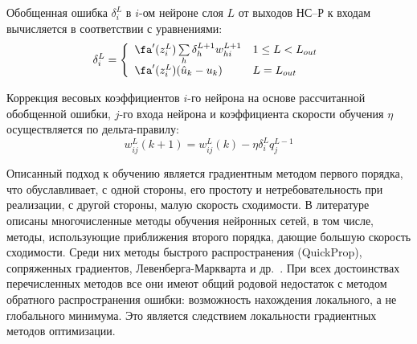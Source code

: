 Обобщенная ошибка $\delta^L_i$ в $i$-ом нейроне слоя $L$ от выходов
НС--Р к входам вычисляется в соответствии с уравнениями:
\begin{equation}\label{eq:nnc-generalized-error}
  \delta^L_i=\left\{
  \begin{array}{ll}
    \fa'(z^L_i)\sum\limits_h\delta^{L+1}_h w^{L+1}_{hi} & 1\le L<L_{out} \\
    \fa'(z^L_i)(\hat{u}_k-u_k) & L=L_{out} \\
  \end{array}\right.
\end{equation}


Коррекция весовых коэффициентов $i$-го нейрона на основе рассчитанной
обобщенной ошибки, $j$-го входа нейрона и коэффициента скорости
обучения $\eta$ осуществляется по дельта-правилу:
\begin{equation}\label{eq:nnc-weights-update}
  w^L_{ij}(k+1)=w^L_{ij}(k)-\eta\delta^L_i q^{L-1}_j
\end{equation}

Описанный подход к обучению является градиентным методом первого
порядка, что обуславливает, с одной стороны, его простоту и
нетребовательность при реализации, с другой стороны, малую скорость
сходимости.  В литературе описаны многочисленные методы обучения
нейронных сетей, в том числе, методы, использующие приближения второго
порядка, дающие большую скорость сходимости.  Среди них методы
быстрого распространения (QuickProp), сопряженных градиентов,
Левенберга-Маркварта и др.~\cite{osov04,haykin2008,gibb96}.  При всех
достоинствах перечисленных методов все они имеют общий родовой
недостаток с методом обратного распространения ошибки: возможность
нахождения локального, а не глобального минимума.  Это является
следствием локальности градиентных методов оптимизации.

